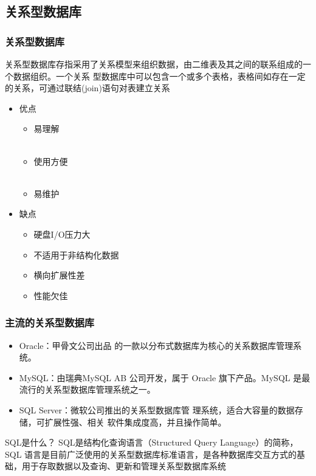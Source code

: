 \documentclass[t]{beamer}
\begin{document}
\subsection{关系型数据库}

\begin{frame}
    \frametitle{关系型数据库}
    关系型数据库存指采用了关系模型来组织数据，由二维表及其之间的联系组成的一个数据组织。一个关系 型数据库中可以包含一个或多个表格，表格间如存在一定的关系，可通过联结(join)语句对表建立关系
\begin{multicols}{2}
\begin{itemize}
  \item 优点
  \begin{itemize}
    \item 易理解\\~\\ \item 使用方便\\~\\ \item  易维护
  \end{itemize}
  \item 缺点
  \begin{itemize}
    \item 硬盘I/O压力大
    \item  不适用于非结构化数据 \item  横向扩展性差
    \item  性能欠佳
  \end{itemize}
\end{itemize}
\end{multicols}

\end{frame}

\begin{frame}
    \frametitle{主流的关系型数据库}
\begin{itemize}
  \item Oracle：甲骨文公司出品 的一款以分布式数据库为核心的关系数据库管理系统。
  \item MySQL：由瑞典MySQL AB 公司开发，属于 Oracle 旗下产品。MySQL
   是最流行的关系型数据库管理系统之一。
   \item SQL Server：微软公司推出的关系型数据库管 理系统，适合大容量的数据存储，可扩展性强、相关 软件集成度高，并且操作简单。
\end{itemize}

\begin{block}{SQL是什么？}
  SQL是结构化查询语言（Structured Query Language）的简称，SQL 语言是目前广泛使用的关系型数据库标准语言，是各种数据库交互方式的基础，用于存取数据以及查询、更新和管理关系型数据库系统
\end{block}

\end{frame}
\end{document}
